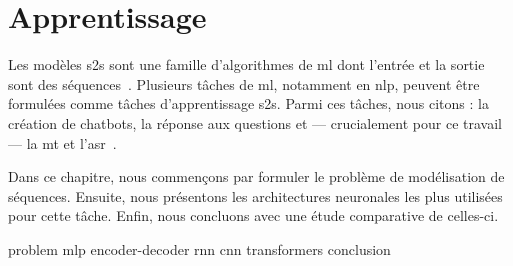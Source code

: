 \chapter{Apprentissage }%
\label{chap.s2s}

Les modèles \gls{s2s} sont une famille d'algorithmes de \gls{ml}
dont l'entrée et la sortie sont des séquences~\cite{Martins_2018}.
Plusieurs tâches de \gls{ml}, notamment en \gls{nlp}, 
peuvent être formulées comme tâches d'apprentissage \gls{s2s}.
Parmi ces tâches, nous citons : la création de chatbots, la réponse aux questions
et --- crucialement pour ce travail --- la \gls{mt} et l'\gls{asr}~\cite{Fathi_2021}.

Dans ce chapitre, nous commençons par formuler le problème de modélisation de séquences.
Ensuite, nous présentons les architectures neuronales les plus utilisées pour cette tâche.
Enfin, nous concluons avec une étude comparative de celles-ci.

{problem}
{mlp}
{encoder-decoder}
{rnn}
{cnn}
{transformers}
{conclusion}
